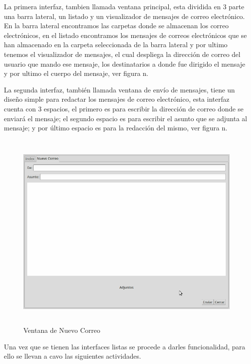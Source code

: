 La primera  interfaz, tambien llamada ventana principal, esta dividida en 3 parte una barra lateral, un listado y un visualizador de mensajes de correo electrónico. En la barra lateral encontramos las carpetas donde se almacenan los correo electrónicos, en el listado encontramos los mensajes de correos electrónicos que se han almacenado en la carpeta seleccionada de la barra lateral y por ultimo tenemos el visualizador de mensajes, el cual  despliega la dirección de correo del usuario que mando ese mensaje, los destinatarios a donde fue dirigido el mensaje y por ultimo el cuerpo del mensaje, ver figura n.

La segunda interfaz, también llamada ventana de envío de mensajes,  tiene un diseño simple para redactar los mensajes de correo electrónico, esta interfaz cuenta con 3 espacios, el primero es para escribir la dirección de correo donde se enviará el mensaje; el segundo espacio es para escribir el asunto que se adjunta al mensaje; y por último espacio es para la redacción del mismo, ver figura n.
\begin{figure}[H]
\centering
	\includegraphics[width=15cm, height=10cm]{./images/VentanaNewCorreo.png}
	\caption{Ventana de Nuevo Correo}
	\label{fig:6-10-3}
\end{figure}
Una vez que se tienen las interfaces listas se procede a darles funcionalidad, para ello se llevan a cavo las siguientes actividades.
